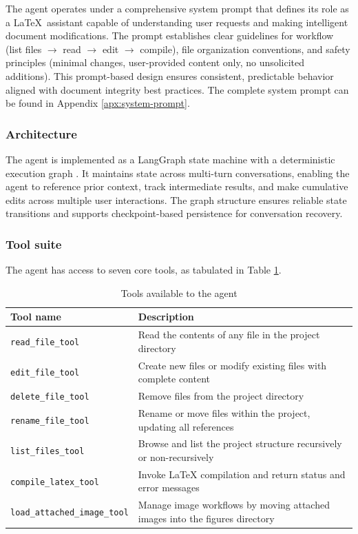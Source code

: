 The agent operates under a comprehensive system prompt that defines its role as a \LaTeX\ assistant capable of understanding user requests and making intelligent document modifications.
The prompt establishes clear guidelines for workflow (list files $\rightarrow$ read $\rightarrow$ edit $\rightarrow$ compile), file organization conventions, and safety principles (minimal changes, user-provided content only, no unsolicited additions).
This prompt-based design ensures consistent, predictable behavior aligned with document integrity best practices.
The complete system prompt can be found in Appendix \ref{apx:system-prompt}.

\subsubsection{Architecture}

The agent is implemented as a LangGraph state machine with a deterministic execution graph \cite{langgraph}.
It maintains state across multi-turn conversations, enabling the agent to reference prior context, track intermediate results, and make cumulative edits across multiple user interactions.
The graph structure ensures reliable state transitions and supports checkpoint-based persistence for conversation recovery.

\subsubsection{Tool suite}

The agent has access to seven core tools, as tabulated in Table \ref{tab:agent_tools}.

\begin{table}[htbp]
\centering
\begin{tabular}{|l|p{8cm}|}
\hline
\textbf{Tool name} & \textbf{Description} \\
\hline
\texttt{read\_file\_tool} & Read the contents of any file in the project directory \\
\hline
\texttt{edit\_file\_tool} & Create new files or modify existing files with complete content \\
\hline
\texttt{delete\_file\_tool} & Remove files from the project directory \\
\hline
\texttt{rename\_file\_tool} & Rename or move files within the project, updating all references \\
\hline
\texttt{list\_files\_tool} & Browse and list the project structure recursively or non-recursively \\
\hline
\texttt{compile\_latex\_tool} & Invoke LaTeX compilation and return status and error messages \\
\hline
\texttt{load\_attached\_image\_tool} & Manage image workflows by moving attached images into the figures directory \\
\hline
\end{tabular}
\caption{Tools available to the agent}
\label{tab:agent_tools}
\end{table}

